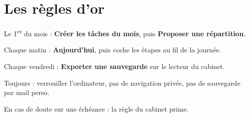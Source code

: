 \documentclass[11pt,a4paper]{article}
\newcommand{\btn}[1]{\textbf{#1}}
\begin{document}
\section*{Les règles d’or}
\begin{securite}
\begin{etapes}
  \item Le 1\textsuperscript{er} du mois : \btn{Créer les tâches du mois}, puis \btn{Proposer une répartition}.
  \item Chaque matin : \btn{Aujourd’hui}, puis coche les étapes au fil de la journée.
  \item Chaque vendredi : \btn{Exporter une sauvegarde} sur le lecteur du cabinet.
  \item Toujours : verrouiller l’ordinateur, pas de navigation privée, pas de sauvegarde par mail perso.
  \item En cas de doute sur une échéance : la règle du cabinet prime.
\end{etapes}
\end{securite}
\end{document}
